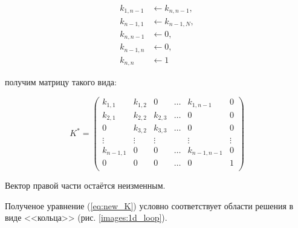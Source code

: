 
        \begin{align*}
            k_{1,n-1} &\leftarrow k_{n,n-1}, \\
            k_{n-1,1} &\leftarrow k_{n-1,N}, \\
            k_{n,n-1} &\leftarrow 0, \\
            k_{n-1,n} &\leftarrow 0, \\
            k_{n,n}   &\leftarrow 1
        \end{align*}

получим матрицу такого вида:

\begin{equation}
    K^* =
    \left(
        \begin{array}{cccccc}
            k_{1,1}   & k_{1,2} & 0       & \ldots & k_{1,n-1}   & 0      \\
            k_{2,1}   & k_{2,2} & k_{2,3} & \ldots & 0           & 0      \\
            0         & k_{3,2} & k_{3,3} & \ldots & 0           & 0      \\
            \vdots    & \vdots  & \vdots  &        & \vdots      & \vdots \\
            k_{n-1,1} & 0       & 0       & \ldots & k_{n-1,n-1} & 0      \\
            0         & 0       & 0       & \ldots & 0           & 1      \\
        \end{array}
    \right)
    \label{equ:k2}  
\end{equation}

Вектор правой части остаётся неизменным.

Полученое уравнение (\ref{eq:new_K}) условно соответствует области решения в виде <<кольца>> (рис. \ref{images:1d_loop}).

